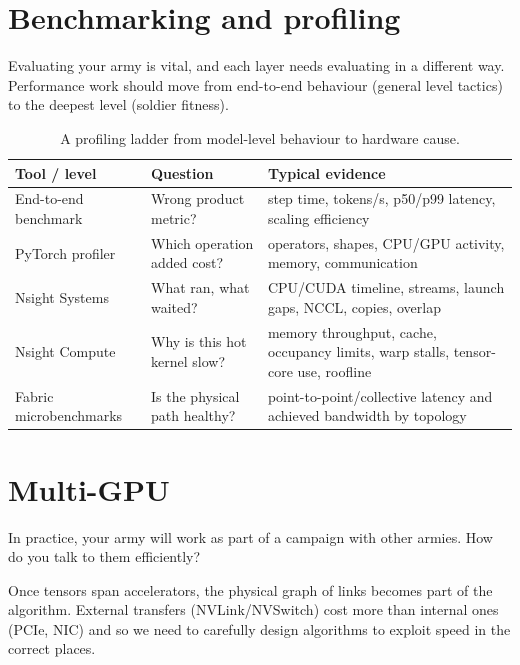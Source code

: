\section{Benchmarking and profiling}
\label{sec:hardware-profiling}
Evaluating your army is vital, and each layer needs evaluating in a different way.
Performance work should move from end-to-end behaviour (general level tactics) to the deepest level (soldier fitness). 

\begin{table}[H]
\centering
\small
\caption{A profiling ladder from model-level behaviour to hardware cause.}
\label{tab:profiling-ladder}
\begin{tabularx}{\textwidth}{@{}>{\raggedright\arraybackslash}p{2.75cm}>{\raggedright\arraybackslash}p{3.0cm}>{\raggedright\arraybackslash}X@{}}
\toprule
\textbf{Tool / level} & \textbf{Question} & \textbf{Typical evidence} \\
\midrule
End-to-end benchmark & Wrong product metric? & step time, tokens/s, p50/p99 latency, scaling efficiency \\
PyTorch profiler & Which operation added cost? & operators, shapes, CPU/GPU activity, memory, communication \\
Nsight Systems & What ran, what waited? & CPU/CUDA timeline, streams, launch gaps, NCCL, copies, overlap \\
Nsight Compute & Why is this hot kernel slow? & memory throughput, cache, occupancy limits, warp stalls, tensor-core use, roofline \\
Fabric microbenchmarks & Is the physical path healthy? & point-to-point/collective latency and achieved bandwidth by topology \\
\bottomrule
\end{tabularx}
\end{table}


\section{Multi-GPU}
\label{sec:hardware-multigpu}
In practice, your army will work as part of a campaign with other armies. 
How do you talk to them efficiently?

Once tensors span accelerators, the physical graph of links becomes part of the algorithm.
External transfers (NVLink/NVSwitch) cost more than internal ones (PCIe, NIC) and so we need to carefully design algorithms to exploit speed in the correct places.

